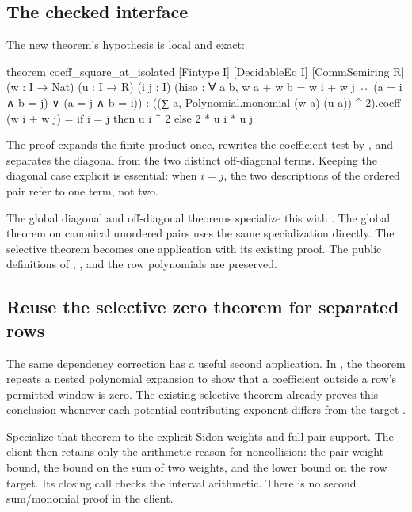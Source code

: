 \subsection{The checked interface}

The new theorem's hypothesis is local and exact:
\begin{lean}
theorem coeff_square_at_isolated
    [Fintype I] [DecidableEq I] [CommSemiring R]
    (w : I → Nat) (u : I → R) (i j : I)
    (hiso : ∀ a b, w a + w b = w i + w j ↔
      (a = i ∧ b = j) ∨ (a = j ∧ b = i)) :
    ((∑ a, Polynomial.monomial (w a) (u a)) ^ 2).coeff
      (w i + w j) = if i = j then u i ^ 2 else 2 * u i * u j
\end{lean}

The proof expands the finite product once, rewrites the coefficient test by
, and separates the diagonal from the two distinct off-diagonal
terms. Keeping the diagonal case explicit is essential: when \(i=j\), the
two descriptions of the ordered pair refer to one term, not two.

The global diagonal and off-diagonal theorems specialize this with
. The global theorem on canonical
unordered pairs uses the same specialization directly. The selective
theorem becomes one application with its existing  proof.
The public definitions of , , and the row
polynomials are preserved.

\subsection{Reuse the selective zero theorem for separated rows}

The same dependency correction has a useful second application. In
, the theorem
 repeats a nested
polynomial expansion to show that a coefficient outside a row's permitted
window is zero. The existing selective theorem
 already proves this conclusion whenever each
potential contributing exponent differs from the target
\cite{multi,selective}.

Specialize that theorem to the explicit Sidon weights and full pair
support. The client then retains only the arithmetic reason for
noncollision: the pair-weight bound, the bound on the sum of two weights,
and the lower bound on the row target. Its closing  call checks
the interval arithmetic. There is no second sum/monomial proof in the
client.

